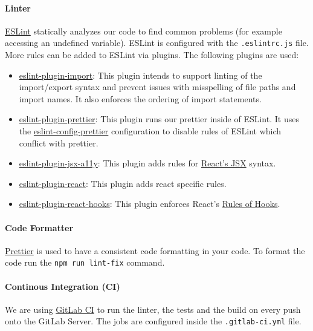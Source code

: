 \paragraph{Linter}
\href{https://eslint.org}{ESLint} statically analyzes our code to find common problems (for example accessing an undefined variable). 
ESLint is configured with the \texttt{.eslintrc.js} file. 
More rules can be added to ESLint via plugins. 
The following plugins are used:
\begin{itemize}
    \item \href{https://www.npmjs.com/package/eslint-plugin-import}{eslint-plugin-import}: 
      This plugin intends to support linting of the import/export syntax and prevent issues with misspelling of file paths and import names. 
      It also enforces the ordering of import statements.
    \item \href{https://www.npmjs.com/package/eslint-plugin-prettier}{eslint-plugin-prettier}:
      This plugin runs our  prettier inside of ESLint. 
      It uses the \href{https://www.npmjs.com/package/eslint-config-prettier}{eslint-config-prettier} configuration to disable rules of ESLint which conflict with prettier.
    \item \href{https://www.npmjs.com/package/eslint-plugin-jsx-a11y}{eslint-plugin-jsx-a11y}: This plugin adds rules for \href{https://reactjs.org/docs/introducing-jsx.html}{React's JSX} syntax.
    \item \href{https://www.npmjs.com/package/eslint-plugin-react}{eslint-plugin-react}: This plugin adds react specific rules.
    \item \href{https://www.npmjs.com/package/eslint-plugin-react-hooks}{eslint-plugin-react-hooks}: This plugin enforces React's \href{https://reactjs.org/docs/hooks-rules.html}{Rules of Hooks}.
\end{itemize}

\paragraph{Code Formatter}
\label{sec:code-formatter}
\href{https://prettier.io}{Prettier} is used to have a consistent code formatting in your code. 
To format the code run the \texttt{npm run lint-fix} command.

\paragraph{Continous Integration (CI)}
We are using \href{https://mad-srv.informatik.uni-erlangen.de/help/ci/README.md}{GitLab CI} to run the linter, the tests and the build on every push onto the GitLab Server. 
The jobs are configured inside the \texttt{.gitlab-ci.yml} file.

